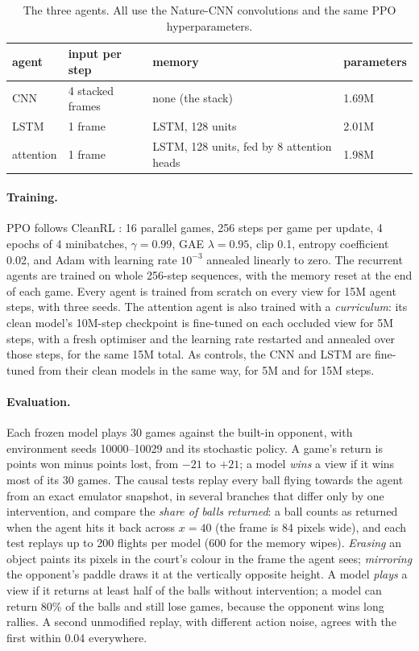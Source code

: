 \documentclass[11pt]{article}
\begin{document}
\begin{table}[t]
  \centering
  \small
  \begin{tabular}{llll}
    \toprule
    agent & input per step & memory & parameters \\
    \midrule
    CNN & 4 stacked frames & none (the stack) & 1.69M \\
    LSTM & 1 frame & LSTM, 128 units & 2.01M \\
    attention & 1 frame & LSTM, 128 units, fed by 8 attention heads & 1.98M \\
    \bottomrule
  \end{tabular}
  \caption{The three agents. All use the Nature-CNN convolutions and the same PPO hyperparameters.}
  \label{tab:agents}
\end{table}

\paragraph{Training.} PPO \citep{schulman2017ppo} follows CleanRL \citep{huang2022cleanrl}: 16 parallel
games, 256 steps per game per update, 4 epochs of 4 minibatches, $\gamma=0.99$, GAE $\lambda=0.95$, clip
0.1, entropy coefficient 0.02, and Adam with learning rate $10^{-3}$ annealed linearly to zero. The recurrent
agents are trained on whole 256-step sequences, with the memory reset at the end of each game. Every agent is
trained from scratch on every view for 15M agent steps, with three seeds. The attention agent is also trained
with a \emph{curriculum}: its clean model's 10M-step checkpoint is fine-tuned on each occluded view for 5M
steps, with a fresh optimiser and the learning rate restarted and annealed over those steps, for the same
15M total. As controls, the CNN and LSTM are fine-tuned from their clean models in the same way, for 5M and
for 15M steps.

\paragraph{Evaluation.} Each frozen model plays 30 games against the built-in opponent, with environment
seeds 10000--10029 and its stochastic policy. A game's return is points won minus points lost, from $-21$ to
$+21$; a model \emph{wins} a view if it wins most of its 30 games. The causal tests replay every ball flying
towards the agent from an exact emulator snapshot, in several branches that differ only by one intervention,
and compare the \emph{share of balls returned}: a ball counts as returned when the agent hits it back
across $x=40$ (the frame is 84 pixels wide), and each test replays up to 200 flights per model (600 for the
memory wipes). \emph{Erasing} an object paints its pixels in the court's colour in the frame the agent sees;
\emph{mirroring} the opponent's paddle draws it at the vertically opposite height. A model \emph{plays} a view if it returns at least half of
the balls without intervention; a model can return 80\% of the balls and still lose games, because the
opponent wins long rallies. A second unmodified replay, with different action noise, agrees with the first
within 0.04 everywhere.
\end{document}
